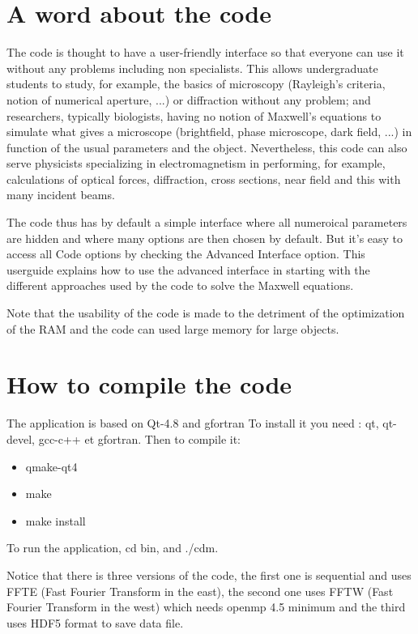\section{A word about the code}

The code is thought to have a user-friendly interface so that everyone
can use it without any problems including non specialists. This allows
undergraduate students to study, for example, the basics of microscopy
(Rayleigh's criteria, notion of numerical aperture, ...)  or
diffraction without any problem; and researchers, typically
biologists, having no notion of Maxwell's equations to simulate what
gives a microscope (brightfield, phase microscope, dark field, ...) in
function of the usual parameters and the object. Nevertheless, this
code can also serve physicists specializing in electromagnetism in
performing, for example, calculations of optical forces, diffraction,
cross sections, near field and this with many incident beams.

The code thus has by default a simple interface where all numeroical
parameters are hidden and where many options are then chosen by
default. But it's easy to access all Code options by checking the
Advanced Interface option. This userguide explains how to use the
advanced interface in starting with the different approaches used by
the code to solve the Maxwell equations.

Note that the usability of the code is made to the detriment of the
optimization of the RAM and the code can used large memory for large
objects.


\section{How to compile the code}

The application is based on Qt-4.8 and gfortran To install it you need
: qt, qt-devel, gcc-c++ et gfortran. Then to compile it:
\begin{itemize}
\item qmake-qt4
\item make
\item make install
\end{itemize}

To run the application, cd bin, and ./cdm.

Notice that there is three versions of the code, the first one is
sequential and uses FFTE (Fast Fourier Transform in the east), the
second one uses FFTW (Fast Fourier Transform in the west) which needs
openmp 4.5 minimum and the third uses HDF5 format to save data file.

